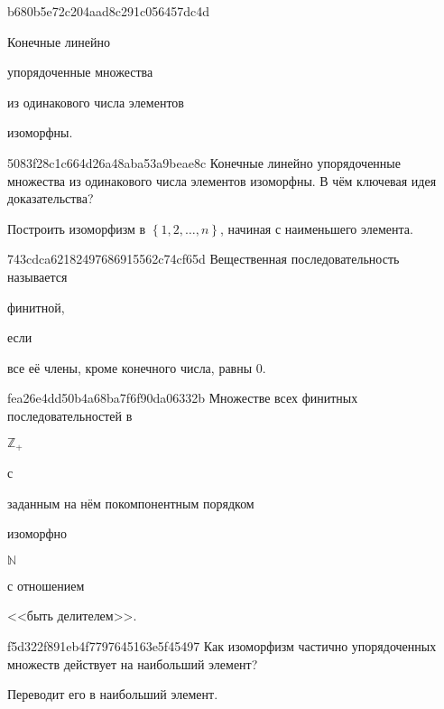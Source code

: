 \begin{note}{b680b5e72c204aad8c291c056457dc4d}
    \begin{icloze}{1}Конечные линейно\end{icloze} упорядоченные множества \begin{icloze}{2}из одинакового числа элементов\end{icloze} \begin{icloze}{3}изоморфны.\end{icloze}
\end{note}

\begin{note}{5083f28c1c664d26a48aba53a9beae8c}
    Конечные линейно упорядоченные множества из одинакового числа элементов изоморфны.
    В чём ключевая идея доказательства?

    \begin{cloze}{1}
        Построить изоморфизм в \({ \left\{ 1, 2, \ldots, n \right\} }\), начиная с наименьшего элемента.
    \end{cloze}
\end{note}

\begin{note}{743cdca62182497686915562c74cf65d}
    Вещественная последовательность называется \begin{icloze}{2}финитной,\end{icloze} если \begin{icloze}{1}все её члены, кроме конечного числа, равны \({ 0 }\).\end{icloze}
\end{note}

\begin{note}{fea26e4dd50b4a68ba7f6f90da06332b}
    Множестве всех финитных последовательностей в \begin{icloze}{4}\({ \mathbb Z_+ }\)\end{icloze} с \begin{icloze}{3}заданным на нём покомпонентным порядком\end{icloze} изоморфно \begin{icloze}{2}\({ \mathbb N }\)\end{icloze} с отношением \begin{icloze}{1}<<быть делителем>>.\end{icloze}
\end{note}

\begin{note}{f5d322f891eb4f7797645163e5f45497}
    Как изоморфизм частично упорядоченных множеств действует на наибольший элемент?

    \begin{cloze}{1}
        Переводит его в наибольший элемент.
    \end{cloze}
\end{note}

